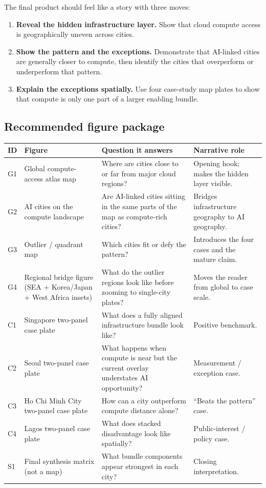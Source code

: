 \documentclass[11pt]{article}
\begin{document}
The final product should feel like a story with three moves:

\begin{enumerate}[leftmargin=1.4em,itemsep=0.35em]
    \item \textbf{Reveal the hidden infrastructure layer.} Show that cloud compute access is geographically uneven across cities.
    \item \textbf{Show the pattern and the exceptions.} Demonstrate that AI-linked cities are generally closer to compute, then identify the cities that overperform or underperform that pattern.
    \item \textbf{Explain the exceptions spatially.} Use four case-study map plates to show that compute is only one part of a larger enabling bundle.
\end{enumerate}

\subsection{Recommended figure package}

\begin{center}
\begin{tabularx}{\textwidth}{P{0.08\textwidth} P{0.23\textwidth} P{0.25\textwidth} Y}
\toprule
\textbf{ID} & \textbf{Figure} & \textbf{Question it answers} & \textbf{Narrative role} \\
\midrule
G1 & Global compute-access atlas map & Where are cities close to or far from major cloud regions? & Opening hook; makes the hidden layer visible. \\
G2 & AI cities on the compute landscape & Are AI-linked cities sitting in the same parts of the map as compute-rich cities? & Bridges infrastructure geography to AI geography. \\
G3 & Outlier / quadrant map & Which cities fit or defy the pattern? & Introduces the four cases and the mature claim. \\
G4 & Regional bridge figure (SEA + Korea/Japan + West Africa insets) & What do the outlier regions look like before zooming to single-city plates? & Moves the reader from global to case scale. \\
C1 & Singapore two-panel case plate & What does a fully aligned infrastructure bundle look like? & Positive benchmark. \\
C2 & Seoul two-panel case plate & What happens when compute is near but the current overlay understates AI opportunity? & Measurement / exception case. \\
C3 & Ho Chi Minh City two-panel case plate & How can a city outperform compute distance alone? & ``Beats the pattern'' case. \\
C4 & Lagos two-panel case plate & What does stacked disadvantage look like spatially? & Public-interest / policy case. \\
S1 & Final synthesis matrix (not a map) & What bundle components appear strongest in each city? & Closing interpretation. \\
\bottomrule
\end{tabularx}
\end{center}
\end{document}
